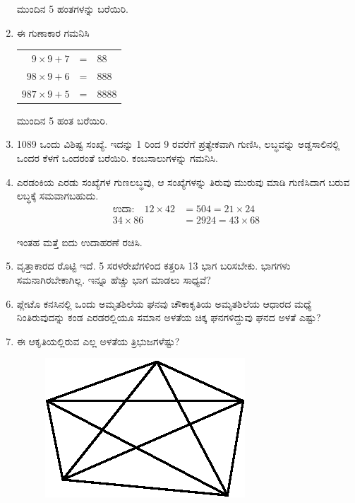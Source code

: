 \begin{enumerate}
ಮುಂದಿನ 5 ಹಂತಗಳನ್ನು ಬರೆಯಿರಿ. 

\item ಈ ಗುಣಾಕಾರ ಗಮನಿಸಿ 

\begin{tabular}[t]{rcl}
$9 \times 9 + 7$ & = & $88$\\
$98 \times 9 + 6$ & = & $888$\\
$987 \times 9 + 5$ & = & $8888$
\end{tabular}

ಮುಂದಿನ 5 ಹಂತ ಬರೆಯಿರಿ.

\item 1089 ಒಂದು ವಿಶಿಷ್ಟ ಸಂಖ್ಯೆ. ಇದನ್ನು 1 ರಿಂದ 9 ರವರೆಗೆ ಪ್ರತ್ಯೇಕವಾಗಿ ಗುಣಿಸಿ, ಲಬ್ಧವನ್ನು ಅಡ್ಡಸಾಲಿನಲ್ಲಿ ಒಂದರ ಕೆಳಗೆ ಒಂದರಂತೆ ಬರೆಯಿರಿ. ಕಂಬಸಾಲುಗಳನ್ನು ಗಮನಿಸಿ.

\item ಎರಡಂಕಿಯ ಎರಡು ಸಂಖ್ಯೆಗಳ ಗುಣಲಬ್ಧವು, ಆ ಸಂಖ್ಯೆಗಳನ್ನು ತಿರುವು ಮುರುವು ಮಾಡಿ ಗುಣಿಸಿದಾಗ ಬರುವ ಲಬ್ಧಕ್ಕೆ ಸಮವಾಗಬಹುದು.
\begin{align*}
\text{ಉದಾ:}\quad 12 \times 42 & = 504 = 21 \times 24\\
34 \times 86 & = 2924 = 43 \times 68
\end{align*}

ಇಂತಹ ಮತ್ತೆ ಐದು ಉದಾಹರಣೆ ರಚಿಸಿ.

\item ವೃತ್ತಾಕಾರದ ರೊಟ್ಟಿ ಇದೆ. 5 ಸರಳರೇಖೆಗಳಿಂದ ಕತ್ತರಿಸಿ 13 ಭಾಗ ಬರಿಸಬೇಕು. ಭಾಗಗಳು ಸಮನಾಗಿರಬೇಕಾಗಿಲ್ಲ. ಇನ್ನೂ ಹೆಚ್ಚು ಭಾಗ ಮಾಡಲು ಸಾಧ್ಯವೆ? 

\item ಪ್ಲೇಟೊ ಕನಸಿನಲ್ಲಿ ಒಂದು ಅಮೃತಶಿಲೆಯ ಘನವು ಚೌಕಾಕೃತಿಯ ಅಮೃತಶಿಲೆಯ ಆಧಾರದ ಮಧ್ಯೆ ನಿಂತಿರುವುದನ್ನು ಕಂಡ ಎರಡರಲ್ಲಿಯೂ ಸಮಾನ ಅಳತೆಯ ಚಿಕ್ಕ ಘನಗಳಿದ್ದುವು ಘನದ ಅಳತೆ ಎಷ್ಟು?

\eject

\item ಈ ಆಕೃತಿಯಲ್ಲಿರುವ ಎಲ್ಲ ಅಳತೆಯ ತ್ರಿಭುಜಗಳೆಷ್ಟು?

\begin{figure}[H]
\centering
\includegraphics{images/chap4/q25.eps}
\end{figure}


\end{enumerate}
